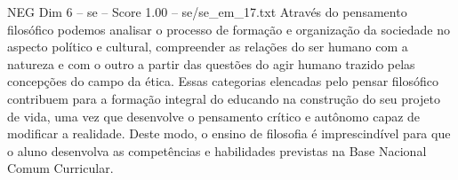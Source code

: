\begin{textsample}{NEG Dim 6 – se – Score 1.00 – se/se\_em\_17.txt}
Através do pensamento filosófico podemos analisar o processo de formação e organização da sociedade no aspecto político e cultural, compreender as relações do ser humano com a natureza e com o outro a partir das questões do agir humano trazido pelas concepções do campo da ética.
Essas categorias elencadas pelo pensar filosófico contribuem para a formação integral do educando na construção do seu projeto de vida, uma vez que desenvolve o pensamento crítico e autônomo capaz de modificar a realidade.
Deste modo, o ensino de filosofia é imprescindível para que o aluno desenvolva as competências e habilidades previstas na Base Nacional Comum Curricular.

\end{textsample}
